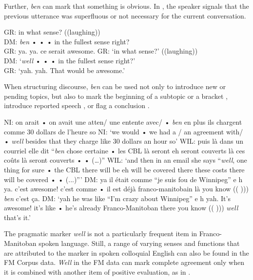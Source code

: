 \documentclass[output=paper]{langscibook}
\begin{document}
\noindent
Further, \textit{ben} can mark that something is obvious. In , the speaker signals that the previous utterance was superfluous or not necessary for the current conversation.

\begin{exe}
    \ex\label{hennecke:ex:39} GR: in what sense? ((laughing)) \\
    DM: \textit{ben} • • • in the fullest sense right? \\
    GR: ya. ya. ce serait awesome.
    \glt GR: ‘in what sense?’ ((laughing)) \\
    DM: ‘\textit{well} • • • in the fullest sense right?’ \\
    GR: ‘yah. yah. That would be awesome.’
\end{exe}


When structuring discourse, \textit{ben} can be used not only to introduce new or pending topics, but also to mark the beginning of a subtopic or a bracket , introduce reported speech , or flag a conclusion .

\begin{exe}
    \ex\label{hennecke:ex:40} NI: on arait • on avait une atten/ une entente avec/ • \textit{ben} en plus ils chargent comme 30 dollars de l’heure so
    \glt NI: ‘we would • we had a / an agreement with/ • \textit{well} besides that they charge like 30 dollars an hour so’
    \ex\label{hennecke:ex:41} WIL: puis là dans un courriel elle dit “\textit{ben} chose certaine • les CBL là seront eh seront couverts là ces coûts là seront couverts • • (…)”
    \glt WIL: ‘and then in an email she says “\textit{well}, one thing for sure •  the CBL there will be eh will be covered there these costs there will be covered • •  (...)”’
    \ex\label{hennecke:ex:42} DM: ya il était comme “je suis fou de Winnipeg” e h ya. c’est awesome! c’est comme • il est déjà franco-manitobain là you know (( ))) \textit{ben} c’est ça.
    \glt DM: ‘yah he was like “I’m crazy about Winnipeg” e h yah. It’s awesome! it’s like • he’s already Franco-Manitoban there you know (( ))) \textit{well} that's it.’
\end{exe}


The pragmatic marker \textit{well} is not a particularly frequent item in Franco-Mani\-to\-ban spoken language. Still, a range of varying senses and functions that are attributed to the marker in spoken colloquial English can also be found in the FM Corpus data. \textit{Well} in the FM data can mark complete agreement only when it is combined with another item of positive evaluation, as in .
\end{document}
